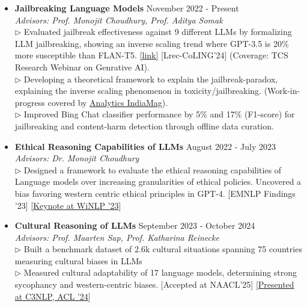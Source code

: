 \documentclass[11pt,letterpaper]{article}
\begin{document}
\begin{itemize}[leftmargin=*,label={},itemsep=6pt]
    \item \textbf{Jailbreaking Language Models} \hfill November 2022 - Present\\
        \textit{Advisors: Prof. Monojit Choudhury, Prof. Aditya Somak}\\
        $\triangleright$ 
            Evaluated jailbreak effectiveness against 9 different LLMs by formalizing LLM jailbreaking, showing an inverse scaling trend where GPT-3.5 is 20\% more susceptible than FLAN-T5.  \href{https://aclanthology.org/2024.lrec-main.458/}{[link]} [Lrec-CoLING'24] (Coverage: TCS Research Webinar on Genrative AI).
        \\
        $\triangleright$ 
            Developing a theoretical framework to explain the jailbreak-paradox, explaining the inverse scaling phenomenon in toxicity/jailbreaking. (Work-in-progress covered by \href{https://analyticsindiamag.com/}{Analytics IndiaMag}).
        \\
        $\triangleright$ 
            Improved Bing Chat classifier performance by 5\% and 17\% (F1-score) for jailbreaking and content-harm detection through offline data curation.
        \\
    \item \textbf{Ethical Reasoning Capabilities of LLMs} \hfill August 2022 - July 2023\\
        \textit{Advisors: Dr. Monojit Choudhury}\\
        $\triangleright$ 
            Designed a framework to evaluate the ethical reasoning capabilities of Language models over increasing granularities of ethical policies. Uncovered a bias favoring western centric ethical principles in GPT-4. [EMNLP Findings '23] [\href{https://2023.winlp.org/schedule/}{Keynote at WiNLP '23}]
        \\
    \item \textbf{Cultural Reasoning of LLMs} \hfill September 2023 - October 2024\\
        \textit{Advisors: Prof. Maarten Sap, Prof. Katharina Reinecke}\\
        $\triangleright$ 
            Built a benchmark dataset of 2.6k cultural situations spanning 75 countries measuring cultural biases in LLMs
        \\
        $\triangleright$ 
            Measured cultural adaptability of 17 language models, determining strong sycophancy and western-centric biases. [Accepted at NAACL'25] [\href{https://c3nlp.github.io/}{Presented at C3NLP, ACL '24}]

\end{itemize}
\end{document}
